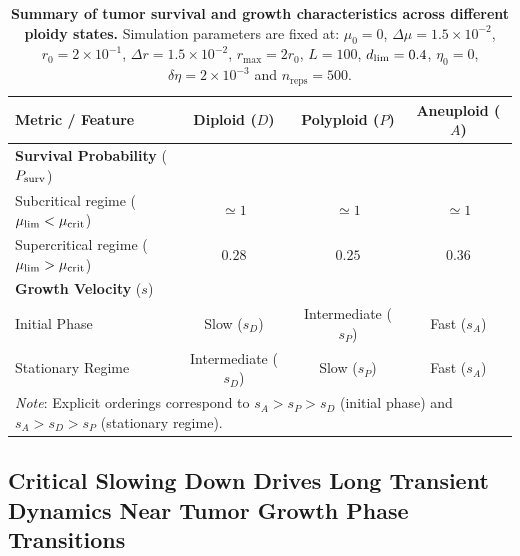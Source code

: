 \documentclass[10pt, aps, rmp,  twocolumn, superscriptaddress, floatfix, showkeys]{revtex4-2}
\begin{document}
\begin{table}[htbp]
\centering
\caption{\textbf{Summary of tumor survival and growth characteristics across different ploidy states.} Simulation parameters are fixed at: $\mu_0 = 0$, $\Delta\mu = 1.5\times10^{-2}$, $r_0 = 2\times10^{-1}$, $\Delta r = 1.5\times10^{-2}$, $r_{\max} = 2r_0$, $L = 100$, $d_{\rm lim} = 0.4$, $\eta_0 = 0$, $\delta\eta = 2\times10^{-3}$ and $n_{\text{reps}}=500$.}
\label{tab:tumor_characteristics}
\begin{ruledtabular}
\begin{tabular}{lccc}
\textbf{Metric / Feature} & \textbf{Diploid ($D$)} & \textbf{Polyploid ($P$)} & \textbf{Aneuploid ($A$)} \\ 
\midrule
\textbf{Survival Probability} ($P_{\rm surv}$) & & & \\
\quad Subcritical regime ($\mu_{\rm lim} < \mu_{\rm crit}$) & $\simeq 1$ & $\simeq 1$ & $\simeq 1$ \\
\quad Supercritical regime ($\mu_{\rm lim} > \mu_{\rm crit}$) & $0.28$ & $0.25$ & $0.36$ \\ 
\midrule
\textbf{Growth Velocity} ($s$) & & & \\
\quad Initial Phase & Slow ($s_D$) & Intermediate ($s_P$) & Fast ($s_A$) \\
\quad Stationary Regime & Intermediate ($s_D$) & Slow ($s_P$) & Fast ($s_A$) \\
\bottomrule
\multicolumn{4}{l}{\small \textit{Note}: Explicit orderings correspond to $s_A > s_P > s_D$ (initial phase) and $s_A > s_D > s_P$ (stationary regime).}
\end{tabular}
\end{ruledtabular}
\end{table}



\subsection*{Critical Slowing Down Drives Long Transient Dynamics Near Tumor Growth Phase Transitions}
\end{document}

